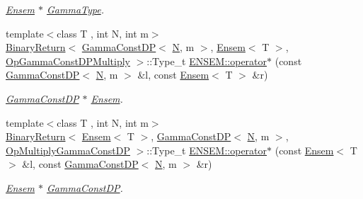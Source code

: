 \begin{DoxyCompactItemize}
\begin{DoxyCompactList}\small\item\em \mbox{\hyperlink{classENSEM_1_1Ensem}{Ensem}} $\ast$ \mbox{\hyperlink{classENSEM_1_1GammaType}{Gamma\+Type}}. \end{DoxyCompactList}\item 
{\footnotesize template$<$class T , int N, int m$>$ }\\\mbox{\hyperlink{structENSEM_1_1BinaryReturn}{Binary\+Return}}$<$ \mbox{\hyperlink{classENSEM_1_1GammaConstDP}{Gamma\+Const\+DP}}$<$ \mbox{\hyperlink{adat__devel_2lib_2hadron_2operator__name__util_8cc_a7722c8ecbb62d99aee7ce68b1752f337}{N}}, m $>$, \mbox{\hyperlink{classENSEM_1_1Ensem}{Ensem}}$<$ T $>$, \mbox{\hyperlink{structENSEM_1_1OpGammaConstDPMultiply}{Op\+Gamma\+Const\+D\+P\+Multiply}} $>$\+::Type\+\_\+t \mbox{\hyperlink{group__eensem_ga60f93a7eee86e9559faa6e162cf9b9a1}{E\+N\+S\+E\+M\+::operator$\ast$}} (const \mbox{\hyperlink{classENSEM_1_1GammaConstDP}{Gamma\+Const\+DP}}$<$ \mbox{\hyperlink{adat__devel_2lib_2hadron_2operator__name__util_8cc_a7722c8ecbb62d99aee7ce68b1752f337}{N}}, m $>$ \&l, const \mbox{\hyperlink{classENSEM_1_1Ensem}{Ensem}}$<$ T $>$ \&r)
\begin{DoxyCompactList}\small\item\em \mbox{\hyperlink{classENSEM_1_1GammaConstDP}{Gamma\+Const\+DP}} $\ast$ \mbox{\hyperlink{classENSEM_1_1Ensem}{Ensem}}. \end{DoxyCompactList}\item 
{\footnotesize template$<$class T , int N, int m$>$ }\\\mbox{\hyperlink{structENSEM_1_1BinaryReturn}{Binary\+Return}}$<$ \mbox{\hyperlink{classENSEM_1_1Ensem}{Ensem}}$<$ T $>$, \mbox{\hyperlink{classENSEM_1_1GammaConstDP}{Gamma\+Const\+DP}}$<$ \mbox{\hyperlink{adat__devel_2lib_2hadron_2operator__name__util_8cc_a7722c8ecbb62d99aee7ce68b1752f337}{N}}, m $>$, \mbox{\hyperlink{structENSEM_1_1OpMultiplyGammaConstDP}{Op\+Multiply\+Gamma\+Const\+DP}} $>$\+::Type\+\_\+t \mbox{\hyperlink{group__eensem_ga0377e46872c4fb569a240b0b60ef577e}{E\+N\+S\+E\+M\+::operator$\ast$}} (const \mbox{\hyperlink{classENSEM_1_1Ensem}{Ensem}}$<$ T $>$ \&l, const \mbox{\hyperlink{classENSEM_1_1GammaConstDP}{Gamma\+Const\+DP}}$<$ \mbox{\hyperlink{adat__devel_2lib_2hadron_2operator__name__util_8cc_a7722c8ecbb62d99aee7ce68b1752f337}{N}}, m $>$ \&r)
\begin{DoxyCompactList}\small\item\em \mbox{\hyperlink{classENSEM_1_1Ensem}{Ensem}} $\ast$ \mbox{\hyperlink{classENSEM_1_1GammaConstDP}{Gamma\+Const\+DP}}. \end{DoxyCompactList}\item 

\end{DoxyCompactItemize}
